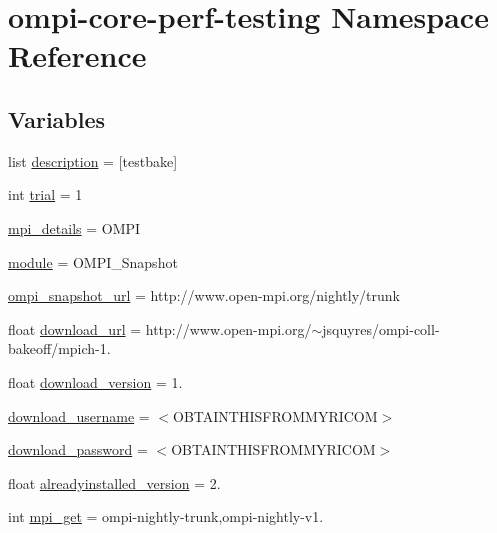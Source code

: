 \hypertarget{namespaceompi-core-perf-testing}{\section{ompi-\/core-\/perf-\/testing Namespace Reference}
\label{namespaceompi-core-perf-testing}
}
\subsection*{Variables}
\begin{DoxyCompactItemize}
\item 
list \hyperlink{namespaceompi-core-perf-testing_a13c12ad10d2eefbe42582df0b6368e00}{description} = \mbox{[}testbake\mbox{]}
\item 
int \hyperlink{namespaceompi-core-perf-testing_a44334128c3f66cfb2779cf372d7021fa}{trial} = 1
\item 
\hyperlink{namespaceompi-core-perf-testing_a0afffa64305d9b33cce67b295a7b6162}{mpi\-\_\-details} = O\-M\-P\-I
\item 
\hyperlink{namespaceompi-core-perf-testing_a9cf3e97fe87ca3ae3174f504ca0003fd}{module} = O\-M\-P\-I\-\_\-\-Snapshot
\item 
\hyperlink{namespaceompi-core-perf-testing_aff15245731ec5f27b42a7377c4ea9555}{ompi\-\_\-snapshot\-\_\-url} = http\-://www.\-open-\/mpi.\-org/nightly/trunk
\item 
float \hyperlink{namespaceompi-core-perf-testing_a9a59a4bdb97826cfdd8302d83ef6fa02}{download\-\_\-url} = http\-://www.\-open-\/mpi.\-org/$\sim$jsquyres/ompi-\/coll-\/bakeoff/mpich-\/1.
\item 
float \hyperlink{namespaceompi-core-perf-testing_a74b2c9b82adde122ece307aaf00bff28}{download\-\_\-version} = 1.
\item 
\hyperlink{namespaceompi-core-perf-testing_a6e85e7b19cb6b339f8ed30ecbc658553}{download\-\_\-username} = $<$O\-B\-T\-A\-I\-N\-T\-H\-I\-S\-F\-R\-O\-M\-M\-Y\-R\-I\-C\-O\-M$>$
\item 
\hyperlink{namespaceompi-core-perf-testing_a5631c42bb25bbe102375dc4662d3b632}{download\-\_\-password} = $<$O\-B\-T\-A\-I\-N\-T\-H\-I\-S\-F\-R\-O\-M\-M\-Y\-R\-I\-C\-O\-M$>$
\item 
float \hyperlink{namespaceompi-core-perf-testing_a0741df34e0d6b86da1d5e8ef8732987d}{alreadyinstalled\-\_\-version} = 2.
\item 
int \hyperlink{namespaceompi-core-perf-testing_ad9dbd4d743b90d239ba06813eeb50181}{mpi\-\_\-get} = ompi-\/nightly-\/trunk,ompi-\/nightly-\/v1.

\end{DoxyCompactItemize}
